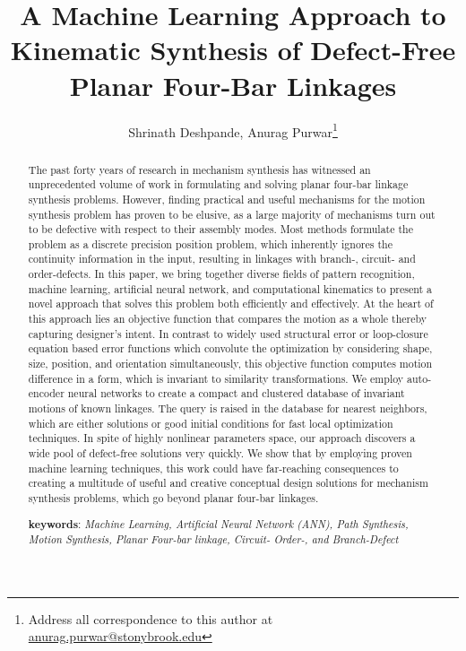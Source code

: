 \documentclass[twocolumn,10pt]{asme2ej}
\title{A Machine Learning Approach to Kinematic Synthesis of Defect-Free Planar Four-Bar Linkages}
\author{Shrinath Deshpande,
	{\tensfb Anurag Purwar\thanks{Address all correspondence to this author at \href{anurag.purwar@stonybrook.edu}{anurag.purwar@stonybrook.edu}}}
    \affiliation{
	Computer-Aided Design and Innovation Lab\\
	Department of Mechanical Engineering\\
	Stony Brook University\\
	Stony Brook, New York, 11794-2300
    }
}
\begin{document}
\maketitle

\begin{abstract}
The past forty years of research in mechanism synthesis has witnessed an unprecedented volume of work in formulating and solving planar four-bar linkage synthesis problems.
However, finding practical and useful mechanisms for the motion synthesis problem has proven to be elusive, as a large majority of mechanisms turn out to be defective with respect to their assembly modes.
Most methods formulate the problem as a discrete precision position problem, which inherently ignores the continuity information in the input, resulting in linkages with branch-, circuit- and order-defects.
In this paper, we bring together diverse fields of pattern recognition, machine learning, artificial neural network, and computational kinematics to present a novel approach that solves this problem both efficiently and effectively.
At the heart of this approach lies an objective function that compares the motion as a whole thereby capturing designer's intent.
In contrast to widely used structural error or loop-closure equation based error functions which convolute the optimization by considering shape, size, position, and orientation simultaneously, this objective function computes motion difference in a form, which is invariant to similarity transformations.
We employ auto-encoder neural networks to create a compact and clustered database of invariant motions of known linkages.
The query is raised in the database for nearest neighbors, which are either solutions or good initial conditions for fast local optimization techniques.
In spite of highly nonlinear parameters space, our approach discovers a wide pool of defect-free solutions very quickly.
We show that by employing proven machine learning techniques, this work could have far-reaching consequences to creating a multitude of useful and creative conceptual design solutions for mechanism synthesis problems, which go beyond planar four-bar linkages.

\textbf{keywords}: \emph{Machine Learning, Artificial Neural Network (ANN), Path Synthesis, Motion Synthesis, Planar Four-bar linkage, Circuit- Order-, and Branch-Defect}

\end{abstract}
\end{document}

